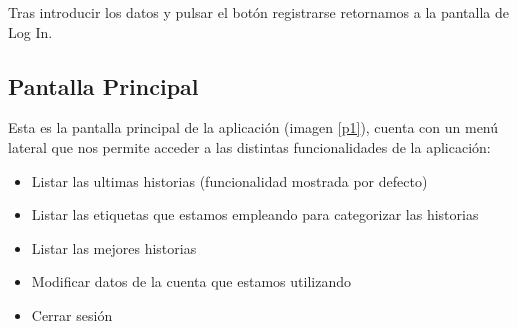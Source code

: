 \documentclass[11pt,a4paper, titlepage]{article}
\begin{document}
Tras introducir los datos y pulsar el botón registrarse retornamos a la pantalla de Log In.
	
	\FloatBarrier
	\subsection[Pantalla Principal]{Pantalla Principal}
	\label{inPrin}
	
	Esta es la pantalla principal de la aplicación (imagen \ref{p1}), cuenta con un menú lateral que nos permite acceder a las distintas funcionalidades de la aplicación:
	
	\begin{itemize}
		\item Listar las ultimas historias (funcionalidad mostrada por defecto)
		\item Listar las etiquetas que estamos empleando para categorizar las historias
		\item Listar las mejores historias
		\item Modificar datos de la cuenta que estamos utilizando
		\item Cerrar sesión
	\end{itemize}
	
\end{document}
